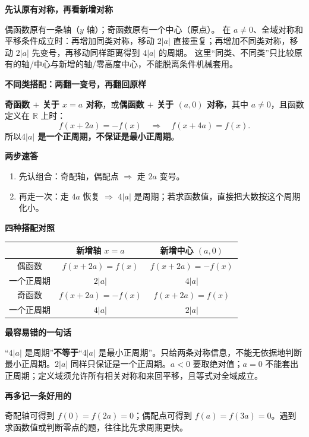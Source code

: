 \clearpage
\begin{summarybox}
\textbf{\textcolor{CSummary}{先认原有对称，再看新增对称}}

偶函数原有一条轴（$y$ 轴）；奇函数原有一个中心（原点）。
在 $a\ne0$、全域对称和平移条件成立时：再增加同类对称，移动 $2|a|$ 直接重复；再增加不同类对称，移动 $2|a|$ 先变号，再移动同样距离得到 $4|a|$ 的周期。
这里“同类、不同类”只比较原有的轴/中心与新增的轴/零高度中心，不能脱离条件机械套用。

\medskip
\textbf{\textcolor{CSummary}{不同类搭配：两翻一变号，再翻回原样}}

\textbf{奇函数 $+$ 关于 $x=a$ 对称}，或\textbf{偶函数 $+$ 关于 $(a,0)$ 对称}，其中 $a\ne0$，且函数定义在 $\mathbb{R}$ 上时：
\[
\boxed{f(x+2a)=-f(x)}\quad\Longrightarrow\quad\boxed{f(x+4a)=f(x)}.
\]
所以\textbf{$4|a|$ 是一个正周期，不保证是最小正周期}。

\medskip
\textbf{\textcolor{CSummary}{两步速答}}
\begin{enumerate}[leftmargin=*,itemsep=0.2em]
 \item 先认组合：奇配轴，偶配点 $\Rightarrow$ 走 $2a$ 变号。
 \item 再走一次：走 $4a$ 恢复 $\Rightarrow$ $4|a|$ 是周期；若求函数值，直接把大数按这个周期化小。
\end{enumerate}

\medskip
\textbf{\textcolor{CSummary}{四种搭配对照}}
\begin{center}
\renewcommand{\arraystretch}{1.4}
\begin{tabular}{c|c|c}
 & 新增轴 $x=a$ & 新增中心 $(a,0)$\\\hline
偶函数 & $f(x+2a)=f(x)$ & $f(x+2a)=-f(x)$\\
一个正周期 & $2|a|$ & $4|a|$\\\hline
奇函数 & $f(x+2a)=-f(x)$ & $f(x+2a)=f(x)$\\
一个正周期 & $4|a|$ & $2|a|$
\end{tabular}
\end{center}

\textbf{\textcolor{CSummary}{最容易错的一句话}}

“$4|a|$ 是周期”\textbf{不等于}“$4|a|$ 是最小正周期”。只给两条对称信息，不能无依据地判断最小正周期。$2|a|$ 同样只保证是一个正周期。$a<0$ 要取绝对值；$a=0$ 不能套出正周期；定义域须允许所有相关对称和来回平移，且等式对全域成立。

\medskip
\textbf{\textcolor{CSummary}{再多记一条好用的}}

奇配轴可得到 $f(0)=f(2a)=0$；偶配点可得到 $f(a)=f(3a)=0$。遇到求函数值或判断零点的题，往往比先求周期更快。
\end{summarybox}

